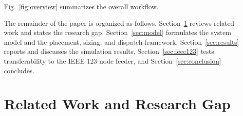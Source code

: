 \documentclass{ieeeaccess}
\begin{document}
Fig.~\ref{fig:overview} summarizes the overall workflow.

The remainder of the paper is organized as follows.
Section~\ref{sec:related} reviews related work and states the research gap.
Section~\ref{sec:model} formulates the system model and the placement, sizing,
and dispatch framework. Section~\ref{sec:results} reports and discusses the
simulation results, Section~\ref{sec:ieee123} tests transferability to the IEEE
123-node feeder, and Section~\ref{sec:conclusion} concludes.

\section{Related Work and Research Gap}
\label{sec:related}
\end{document}
